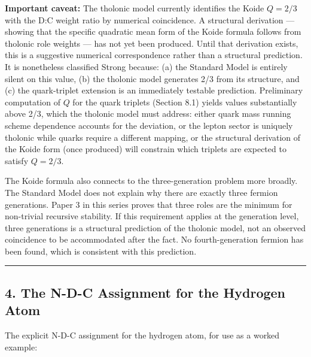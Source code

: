\documentclass[
  11pt,
  letterpaper,
]{article}
\begin{document}
\textbf{Important caveat:} The tholonic model currently identifies the
Koide \(Q = 2/3\) with the D:C weight ratio by numerical coincidence. A
structural derivation --- showing that the specific quadratic mean form
of the Koide formula follows from tholonic role weights --- has not yet
been produced. Until that derivation exists, this is a suggestive
numerical correspondence rather than a structural prediction. It is
nonetheless classified Strong because: (a) the Standard Model is
entirely silent on this value, (b) the tholonic model generates 2/3 from
its structure, and (c) the quark-triplet extension is an immediately
testable prediction. Preliminary computation of \(Q\) for the quark
triplets (Section 8.1) yields values substantially above 2/3, which the
tholonic model must address: either quark mass running scheme dependence
accounts for the deviation, or the lepton sector is uniquely tholonic
while quarks require a different mapping, or the structural derivation
of the Koide form (once produced) will constrain which triplets are
expected to satisfy \(Q = 2/3\).

The Koide formula also connects to the three-generation problem more
broadly. The Standard Model does not explain why there are exactly three
fermion generations. Paper 3 in this series proves that three roles are
the minimum for non-trivial recursive stability. If this requirement
applies at the generation level, three generations is a structural
prediction of the tholonic model, not an observed coincidence to be
accommodated after the fact. No fourth-generation fermion has been
found, which is consistent with this prediction.

\begin{center}\rule{0.5\linewidth}{0.5pt}\end{center}

\subsection{4. The N-D-C Assignment for the Hydrogen
Atom}\label{the-n-d-c-assignment-for-the-hydrogen-atom}

The explicit N-D-C assignment for the hydrogen atom, for use as a worked
example:
\end{document}
